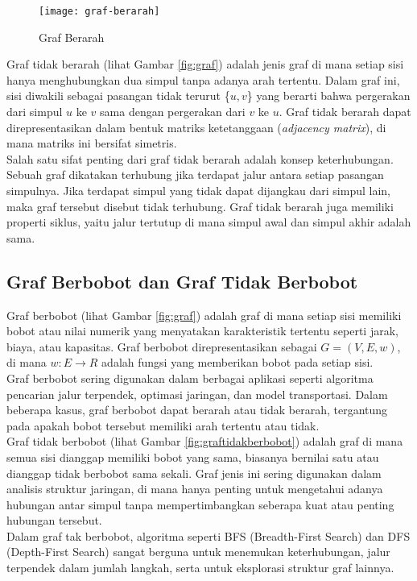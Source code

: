 \begin{figure}[H] 
    \centering  
    \texttt{[image: graf-berarah]}  
    \caption{Graf Berarah}
    \label{fig:grafberarah} 
\end{figure}
\noindent
Graf tidak berarah (lihat Gambar \ref{fig:graf}) adalah jenis graf di mana setiap sisi hanya menghubungkan dua simpul tanpa adanya arah tertentu. Dalam graf ini, sisi diwakili sebagai pasangan tidak terurut \{$u,v$\} yang berarti bahwa pergerakan dari simpul $u$ ke $v$ sama dengan pergerakan dari $v$ ke $u$. Graf tidak berarah dapat direpresentasikan dalam bentuk matriks ketetanggaan (\textit{adjacency matrix}), di mana matriks ini bersifat simetris.
\\
Salah satu sifat penting dari graf tidak berarah adalah konsep keterhubungan. Sebuah graf dikatakan terhubung jika terdapat jalur antara setiap pasangan simpulnya. Jika terdapat simpul yang tidak dapat dijangkau dari simpul lain, maka graf tersebut disebut tidak terhubung. Graf tidak berarah juga memiliki properti siklus, yaitu jalur tertutup di mana simpul awal dan simpul akhir adalah sama.

\subsection{Graf Berbobot dan Graf Tidak Berbobot ~\cite{Diestel:17:graph}}
\label{sec:grafberbobot}
Graf berbobot (lihat Gambar \ref{fig:graf}) adalah graf di mana setiap sisi memiliki bobot atau nilai numerik yang menyatakan karakteristik tertentu seperti jarak, biaya, atau kapasitas. Graf berbobot direpresentasikan sebagai $G = (V,E,w)$, di mana $w:E\rightarrow R$ adalah fungsi yang memberikan bobot pada setiap sisi.
\\
Graf berbobot sering digunakan dalam berbagai aplikasi seperti algoritma pencarian jalur terpendek, optimasi jaringan, dan model transportasi. Dalam beberapa kasus, graf berbobot dapat berarah atau tidak berarah, tergantung pada apakah bobot tersebut memiliki arah tertentu atau tidak.
\\
Graf tidak berbobot (lihat Gambar \ref{fig:graftidakberbobot}) adalah graf di mana semua sisi dianggap memiliki bobot yang sama, biasanya bernilai satu atau dianggap tidak berbobot sama sekali. Graf jenis ini sering digunakan dalam analisis struktur jaringan, di mana hanya penting untuk mengetahui adanya hubungan antar simpul tanpa mempertimbangkan seberapa kuat atau penting hubungan tersebut.
\\
Dalam graf tak berbobot, algoritma seperti BFS (Breadth-First Search) dan DFS (Depth-First Search) sangat berguna untuk menemukan keterhubungan, jalur terpendek dalam jumlah langkah, serta untuk eksplorasi struktur graf lainnya.


